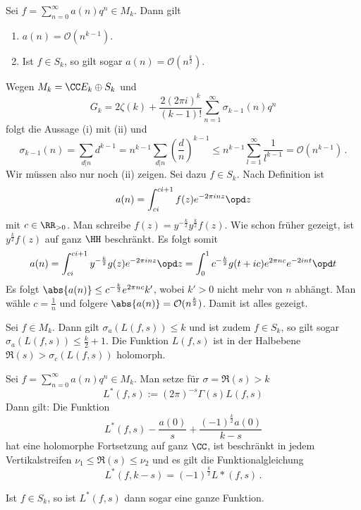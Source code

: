 \begin{satz}
Sei $f = \sum_{n=0}^\infty a(n) q^n \in M_k$. Dann gilt
\begin{enumerate}
\item $a(n) = \mathcal O(n^{k-1})$.
\item Ist $f \in S_k$, so gilt sogar $a(n) = \mathcal O(n^{\frac k2})$.
\end{enumerate}
\end{satz}

\begin{bewe}
Wegen $M_k = \CC E_k \oplus S_k$ und
\[
	G_k = 2 \zeta(k) + \frac {2(2\pi i)^k}{(k-1)!} \sum_{n=1}^\infty \sigma_{k-1}(n) q^n
\]
folgt die Aussage (i) mit (ii) und
\[
	\sigma_{k-1}(n) = \sum_{d|n} d^{k-1} = n^{k-1} \sum_{d|n} \left( \frac dn \right)^{k-1} \leq n^{k-1} \sum_{l=1}^\infty \frac 1{l^{k-1}} = \mathcal O(n^{k-1})
	\,.
\]
Wir müssen also nur noch (ii) zeigen. Sei dazu $f \in S_k$. Nach Definition ist
\[
	a(n) = \int_{ci}^{ci + 1} f(z) e^{-2\pi inz} \opd z
\]
mit $c \in \RR_{>0}$. Man schreibe $f(z) = y^{- \frac k2} y^{\frac k2} f(z)$. Wie schon früher gezeigt, ist $y^{\frac k2} f(z)$ auf ganz $\HH$ beschränkt. Es folgt somit
\[
	a(n) = \int_{ci}^{ci + 1} y^{-\frac k2} g(z) e^{-2\pi inz} \opd z = \int_0^1 c^{- \frac k2} g(t+ic) e^{2\pi nc} e^{-2 int} \opd t
\]
Es folgt $\abs{a(n)} \leq c^{- \frac k2} e^{2\pi nc} k'$, wobei $k' > 0$ nicht mehr von $n$ abhängt. Man wähle $c = \frac 1n$ und folgere $\abs{a(n)} = \mathcal O(n^{\frac k2})$. Damit ist alles gezeigt.
\end{bewe}

\begin{koro}
Sei $f \in M_k$. Dann gilt $\sigma_a (L(f,s)) \leq k$ und ist zudem $f \in S_k$, so gilt sogar $\sigma_a (L(f,s)) \leq \frac k2 + 1$. Die Funktion $L(f,s)$ ist in der Halbebene $\Re(s) > \sigma_c (L(f,s))$ holomorph.
\end{koro}

\begin{satz}[Hecke]
Sei $f = \sum_{n=0}^\infty a(n) q^n \in M_k$. Man setze für $\sigma = \Re(s) > k$
\[
	L^*(f,s) := (2\pi)^{-s} \Gamma(s) L(f,s)
\]
Dann gilt: Die Funktion 
\[
	L^*(f,s) - \frac {a(0)}s + \frac {(-1)^{\frac k2} a(0)}{k-s}
\]
hat eine holomorphe Fortsetzung auf ganz $\CC$, ist beschränkt in jedem Vertikalstreifen $\nu_1 \leq \Re(s) \leq \nu_2$ und es gilt die Funktionalgleichung
\[
	L^*(f,k-s) = (-1)^{\frac k2} L*(f,s)
	\,.
\]
\end{satz}
Ist $f \in S_k$, so ist $L^*(f,s)$ dann sogar eine ganze Funktion.

